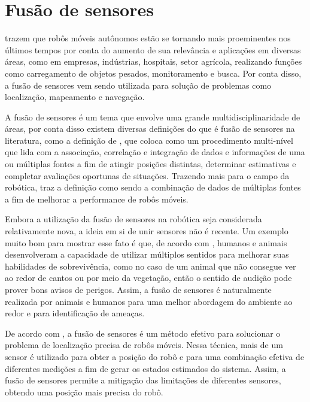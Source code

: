 \documentclass[acronym, symbols]{fei}
\begin{document}
	\section{Fusão de sensores}
	
		\textcite{alatise2020review} trazem que robôs móveis autônomos estão se tornando mais proeminentes nos últimos tempos por conta do aumento de sua relevância e aplicações em diversas áreas, como em empresas, indústrias, hospitais, setor agrícola, realizando funções como carregamento de objetos pesados, monitoramento e busca. Por conta disso, a fusão de sensores vem sendo utilizada para solução de problemas como localização, mapeamento e navegação.
		
		A fusão de sensores é um tema que envolve uma grande multidisciplinaridade de áreas, por conta disso existem diversas definições do que é fusão de sensores na literatura, como a definição de \textcite{white1991data}, que coloca como um procedimento multi-nível que lida com a associação, correlação e integração de dados e informações de uma ou múltiplas fontes a fim de atingir posições distintas, determinar estimativas e completar avaliações oportunas de situações. Trazendo mais para o campo da robótica, \textcite{durrant1988sensor} traz a definição como sendo a combinação de dados de múltiplas fontes a fim de melhorar a performance de robôs móveis.
		
		Embora a utilização da fusão de sensores na robótica seja considerada relativamente nova, a ideia em si de unir sensores não é recente. Um exemplo muito bom para mostrar esse fato é que, de acordo com \textcite{hall1997introduction}, humanos e animais desenvolveram a capacidade de utilizar múltiplos sentidos para melhorar suas habilidades de sobrevivência, como no caso de um animal que não consegue ver ao redor de cantos ou por meio da vegetação, então o sentido de audição pode prover bons avisos de perigos. Assim, a fusão de sensores é naturalmente realizada por animais e humanos para uma melhor abordagem do ambiente ao redor e para identificação de ameaças.
		
		De acordo com \textcite{marton2013two}, a fusão de sensores é um método efetivo para solucionar o problema de localização precisa de robôs móveis. Nessa técnica, mais de um sensor é utilizado para obter a posição do robô e para uma combinação efetiva de diferentes medições a fim de gerar os estados estimados do sistema. Assim, a fusão de sensores permite a mitigação das limitações de diferentes sensores, obtendo uma posição mais precisa do robô.
		
\end{document}
